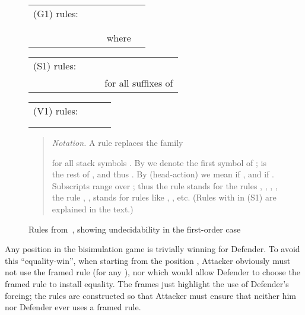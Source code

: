 \documentclass[11pt]{article}
\begin{document}
\begin{figure}[ht]


\begin{tabular}{lllll}
(G1) rules: \hspace{1mm} &  \\  
\vspace{2mm}
&\fbox{} \hspace{5mm} &   
\\
& &
 \\
&& \fbox{} & where 
\end{tabular}




\begin{tabular}{llll}
(S1) rules: \hspace{1mm} & \\
&\fbox{} \hspace{3mm} &
 \hspace{-2mm} &
for all suffixes  of \\
\end{tabular}




\medskip

\begin{tabular}{llll}
(V1) rules: \hspace{1mm} & 
 
 \hspace{4mm} &  
\\
&  &   & \hspace*{2cm} \\
& &   \\
\end{tabular} 


\begin{quote}
\emph{Notation.} 
A rule  replaces the family 
 
for all stack symbols .
By  we denote the first symbol of ;
 is the rest of , and thus 
. 
By  (head-action) we mean 
if , and  if .
Subscripts  range over ;
thus the rule  stands for the  rules
, , , ,
the rule
, , stands for 
rules like , ,
etc. (Rules with  in (S1) are explained in the text.) 
\end{quote}

\caption{Rules from~\cite{DBLP:journals/jacm/JancarS08}, 
showing undecidability in the first-order 
case}\label{fig:rulesystem}
\end{figure}







Any position  in the bisimulation game
is trivially winning for Defender. 
To avoid this ``equality-win'', when
starting from the position , 
Attacker obviously must not use the framed rule  
(for any ), nor  which would
allow Defender to choose the framed rule to install equality. 
The frames just highlight
the use of Defender's forcing;
the rules are constructed so that Attacker must ensure
that neither him nor Defender ever uses a framed rule.
\end{document}
